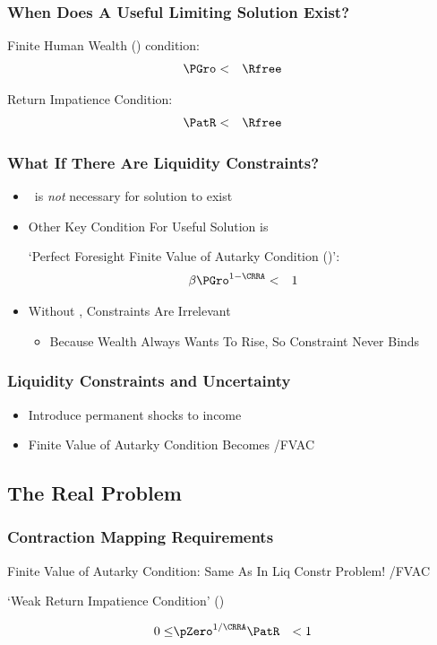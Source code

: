 \documentclass[pdflatex]{beamer}
\begin{document}
\begin{frame}
\frametitle{When Does A Useful Limiting Solution Exist?}

Finite Human Wealth (\FHWC) condition:
\begin{eqnarray}
\PGro & < & \Rfree
\end{eqnarray}

\pause\medskip
Return Impatience Condition:
\begin{eqnarray}
\PatR & < & \Rfree
\end{eqnarray}

\end{frame}

\begin{frame}
\frametitle{What If There Are Liquidity Constraints?}

\pause 

\begin{itemize}
\item \FHWC~is {\it not} necessary for solution to exist
\item Other Key Condition For Useful Solution is

`Perfect Foresight Finite Value of Autarky Condition (\PFFVAC)':
\begin{eqnarray}
\beta \PGro^{1-\CRRA} & < & 1  
\end{eqnarray}

\item Without \RIC, Constraints Are Irrelevant
\begin{itemize}
\item Because Wealth Always Wants To Rise, So Constraint Never Binds
\end{itemize}
\end{itemize}

\end{frame}

\begin{frame}
\frametitle{Liquidity Constraints and Uncertainty}

\begin{itemize}
\item Introduce permanent shocks to income
\item Finite Value of Autarky Condition Becomes
 \LtxDir\EqDir/FVAC
\end{itemize}

\end{frame}



\subsection{The Real Problem}
\begin{frame}
\frametitle{Contraction Mapping Requirements}

Finite Value of Autarky Condition: Same As In Liq Constr Problem!
 \LtxDir\EqDir/FVAC

`Weak Return Impatience Condition' (\WRIC)

\begin{eqnarray}
 0 \leq & \pZero^{1/\CRRA} \PatR & < 1 \label{eq:WRIC}
\end{eqnarray}

\end{frame}
\end{document}
